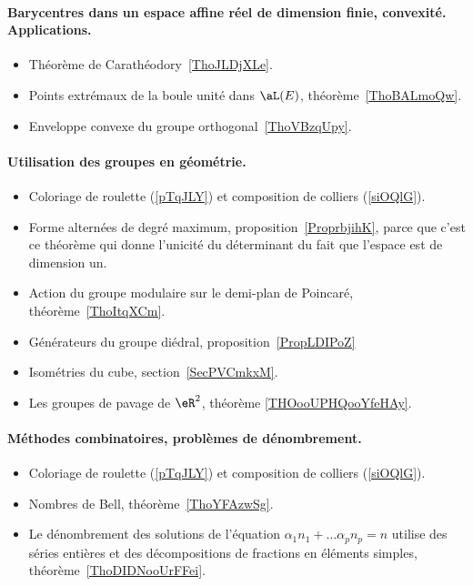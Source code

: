 \paragraph{Barycentres dans un espace affine réel de dimension finie, convexité. Applications.}
\begin{itemize}
    \item Théorème de Carathéodory~\ref{ThoJLDjXLe}.
    \item Points extrémaux de la boule unité dans \( \aL(E)\), théorème~\ref{ThoBALmoQw}.
    \item Enveloppe convexe du groupe orthogonal~\ref{ThoVBzqUpy}.
\end{itemize}
\paragraph{Utilisation des groupes en géométrie.}
\begin{itemize}
    \item Coloriage de roulette (\ref{pTqJLY}) et composition de colliers (\ref{siOQlG}).
    \item Forme alternées de degré maximum, proposition~\ref{ProprbjihK}, parce que c'est ce théorème qui donne l'unicité du déterminant du fait que l'espace est de dimension un.
    \item Action du groupe modulaire sur le demi-plan de Poincaré, théorème~\ref{ThoItqXCm}.
    \item Générateurs du groupe diédral, proposition~\ref{PropLDIPoZ}
    \item Isométries du cube, section~\ref{SecPVCmkxM}.
    \item Les groupes de pavage de \( \eR^2\), théorème \ref{THOooUPHQooYfeHAy}.
\end{itemize}
\paragraph{Méthodes combinatoires, problèmes de dénombrement.}
\begin{itemize}
    \item Coloriage de roulette (\ref{pTqJLY}) et composition de colliers (\ref{siOQlG}).
    \item Nombres de Bell, théorème~\ref{ThoYFAzwSg}.
    \item Le dénombrement des solutions de l'équation \( \alpha_1 n_1+\ldots \alpha_pn_p=n\) utilise des séries entières et des décompositions de fractions en éléments simples, théorème~\ref{ThoDIDNooUrFFei}.
\end{itemize}
